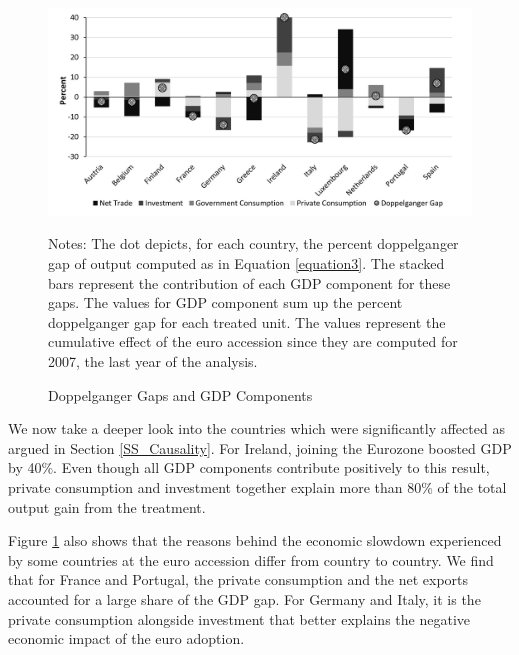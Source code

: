 \documentclass[12pt]{article}
\newcommand{\annote}[1]{\parbox{\textwidth}{\renewcommand{\baselinestretch}{1.0}\vspace{12pt} \small Notes: #1}}
\begin{document}
\begin{figure}[h!]
    \centering
    \caption{Doppelganger Gaps and GDP Components}
    \includegraphics[scale=0.8]{Decomposition.jpg}
    \annote{The dot depicts, for each country, the percent  doppelganger gap of output computed as in Equation \ref{equation3}. The stacked bars represent the contribution of each GDP component for these gaps. The values for GDP component sum up the percent doppelganger gap for each treated unit. The values represent the cumulative effect of the euro accession since they are computed for 2007, the last year of the analysis.}
    \label{F_Decomposition}
\end{figure}




We now take a deeper look into the countries which were significantly affected as argued in Section \ref{SS_Causality}. For Ireland, joining the Eurozone boosted GDP by 40\%. Even though all GDP components contribute positively to this result, private consumption and investment together explain more than 80\% of the total output gain from the treatment.

Figure \ref{F_Decomposition} also shows that the reasons behind the economic slowdown experienced by some countries at the euro accession differ from country to country. We find that for France and Portugal, the private consumption and the net exports accounted for a large share of the GDP gap. For Germany and Italy, it is the private consumption alongside investment that better explains the negative economic impact of the euro adoption.
\end{document}

